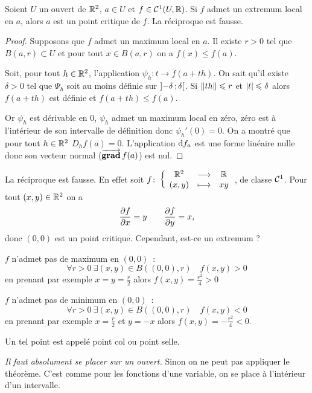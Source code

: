 \begin{theo}
  Soient \(U\) un ouvert de \(\mathbb{R}^2\), \(a \in U\) et \(f \in \mathcal{C}^{1}(U, \mathbb{R})\). Si \(f\) admet un extremum local en \(a\), alors \(a\) est un point critique de \(f\). La réciproque est fausse.
\end{theo}
\begin{proof}
  Supposons que \(f\) admet un maximum local en \(a\). Il existe \(r>0\) tel que \(B(a, r) \subset U\) et pour tout \(x \in B(a, r)\) on a \(f(x)\leqslant f(a)\). 

  Soit, pour tout \(h\in \mathbb{R}^2\), l'application \(\psi_h: t \rightarrow f(a+th)\). On sait qu'il existe \(\delta>0\) tel que \(\Psi_h\) soit au moins définie sur \(\left] -\delta \, ;  \delta \right[\). Si \(\left\lVert th\right\rVert\leqslant r\) et \(\left\lvert t\right\rvert\leqslant \delta\) alors \(f(a+th)\) est définie et \(f(a+th) \leqslant f(a)\). 

Or \(\psi_h\) est dérivable en \(0\), \(\psi_h\) admet un maximum local en zéro, zéro est à l'intérieur de son intervalle de définition donc \(\psi_h'(0)=0\). On a montré que pour tout \(h \in \mathbb{R}^2\) \(D_h f(a)=0\). L'application \(\mathrm{d} f_a\) est une forme linéaire nulle donc son vecteur normal (\(\operatorname{\overrightarrow{\mathbf{grad}}} f(a)\)) est nul.
\end{proof}
%
La réciproque est fausse. En effet soit \(f\colon \left\{\begin{array}{ccc} \mathbb{R}^2 & \longrightarrow &\mathbb{R}\\ (x,y) & \longmapsto & xy \end{array} \right.\), de classe \(\mathcal{C}^{1}\). Pour tout \((x,y) \in \mathbb{R}^2\) on a
\begin{equation}
  \dfrac{\partial{} f}{\partial{} x} = y \qquad \dfrac{\partial{} f}{\partial{} y} = x,
\end{equation}
donc \((0, 0)\) est un point critique. Cependant, est-ce un extremum ?

\(f\) n'admet pas de maximum en \((0,0)\)~:
\begin{equation}
  \forall r>0 \ \exists (x,y) \in B((0,0), r) \quad f(x, y)>0
\end{equation}
en prenant par exemple \(x=y=\frac{r}{2}\) alors \(f(x,y)=\frac{r^2}{4}>0\)

\(f\) n'admet pas de minimum en \((0,0)\)~:
\begin{equation}
  \forall r>0 \ \exists (x,y) \in B((0,0), r) \quad f(x, y)<0
\end{equation}
en prenant par exemple \(x=\frac{r}{2}\) et \(y=-x\) alors \(f(x,y)=-\frac{r^2}{4}<0\).

Un tel point est appelé point col ou point selle.

\emph{Il faut absolument se placer sur un ouvert.} Sinon on ne peut pas appliquer le théorème. C'est comme pour les fonctions d'une variable, on se place à l'intérieur d'un intervalle.

